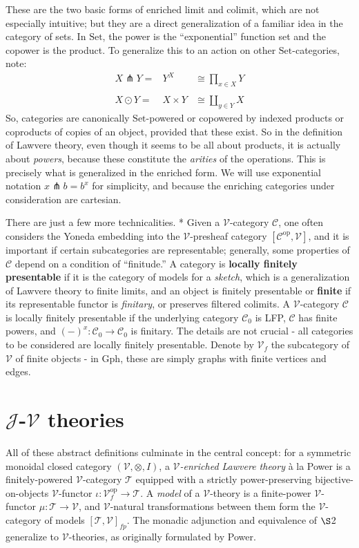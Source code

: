 \documentclass[a4paper,UKenglish]{article}
\theoremstyle{definition}
\newcommand{\Gph}{\mathrm{Gph}}
\newcommand{\Set}{\mathrm{Set}}
\newcommand{\op}{\mathrm{op}}
\newcommand{\V}{\mathscr{V}}
\newcommand{\C}{\mathscr{C}}
\newcommand{\T}{\mathscr{T}}
\newcommand{\J}{\mathscr{J}}
\newcommand{\pfk}{\pitchfork}
\begin{document}
These are the two basic forms of enriched limit and colimit, which are not especially intuitive; but they are a direct generalization of a familiar idea in the category of sets. In $\Set$, the power is the ``exponential'' function set and the copower is the product. To generalize this to an action on other $\Set$-categories, note:
\[\begin{array}{lcr}
	X \pfk Y = & Y^X & \cong \prod_{x\in X}Y\\
	\\
	X \odot Y = & X \times Y & \cong \coprod_{y\in Y}X
\end{array}\]
So, categories are canonically $\Set$-powered or copowered by indexed products or coproducts of copies of an object, provided that these exist. So in the definition of Lawvere theory, even though it seems to be all about products, it is actually about \textit{powers}, because these constitute the \textit{arities} of the operations. This is precisely what is generalized in the enriched form. We will use exponential notation $x\pfk b = b^x$ for simplicity, and because the enriching categories under consideration are cartesian.

There are just a few more technicalities. * Given a $\V$-category $\C$, one often considers the Yoneda embedding into the $\V$-presheaf category $[\C^\op, \V]$, and it is important if certain subcategories are representable; generally, some properties of $\C$ depend on a condition of ``finitude.'' \cite{finite} A category is \textbf{locally finitely presentable} if it is the category of models for a \textit{sketch}, which is a generalization of Lawvere theory to finite limits, and an object is finitely presentable or \textbf{finite} if its representable functor is \textit{finitary}, or preserves filtered colimits. A $\V$-category $\C$ is locally finitely presentable if the underlying category $\C_0$ is LFP, $\C$ has finite powers, and $(-)^x: \C_0 \to \C_0$ is finitary. The details are not crucial - all categories to be considered are locally finitely presentable. Denote by $\V_f$ the subcategory of $\V$ of finite objects - in $\Gph$, these are simply graphs with finite vertices and edges.\\

\section{$\J$-$\V$ theories}
All of these abstract definitions culminate in the central concept: for a symmetric monoidal closed category $(\V,\otimes,I)$, a \textit{$\V$-enriched Lawvere theory} \`a la Power \cite{power} is a finitely-powered $\V$-category $\T$ equipped with a strictly power-preserving bijective-on-objects $\V$-functor $\iota:\V_f^\op \to \T$. A \textit{model} of a $\V$-theory is a finite-power $\V$-functor $\mu:\T \to \V$, and $\V$-natural transformations between them form the $\V$-category of models $[\T,\V]_{fp}$. The monadic adjunction and equivalence of $\S$2 generalize to $\V$-theories, as originally formulated by Power.
\end{document}

